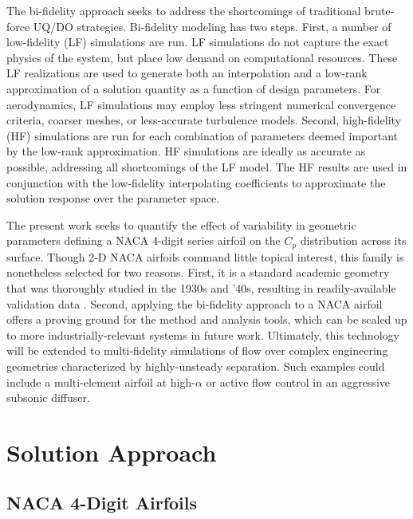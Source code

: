 \documentclass[11pt]{article}
\begin{document}
The bi-fidelity approach seeks to address the shortcomings of traditional brute-force UQ/DO strategies. Bi-fidelity modeling has two steps. First, a number of low-fidelity (LF) simulations are run. LF simulations do not capture the exact physics of the system, but place low demand on computational resources. These LF realizations are used to generate both an interpolation and a low-rank approximation of a solution quantity as a function of design parameters. For aerodynamics, LF simulations may employ less stringent numerical convergence criteria, coarser meshes, or less-accurate turbulence models. Second, high-fidelity (HF) simulations are run for each combination of parameters deemed important by the low-rank approximation. HF simulations are ideally as accurate as possible, addressing all shortcomings of the LF model. The HF results are used in conjunction with the low-fidelity interpolating coefficients to approximate the solution response over the parameter space.

The present work seeks to quantify the effect of variability in geometric parameters defining a NACA 4-digit series airfoil on the $C_p$ distribution across its surface. Though 2-D NACA airfoils command little topical interest, this family is nonetheless selected for two reasons. First, it is a standard academic geometry that was thoroughly studied in the 1930s and '40s, resulting in readily-available validation data \citeme. Second, applying the bi-fidelity approach to a NACA airfoil offers a proving ground for the method and analysis tools, which can be scaled up to more industrially-relevant systems in future work. Ultimately, this technology will be extended to multi-fidelity simulations of flow over complex engineering geometries characterized by highly-unsteady separation. Such examples could include a multi-element airfoil at high-$\alpha$ or active flow control in an aggressive subsonic diffuser.

\section{Solution Approach}

\subsection{NACA 4-Digit Airfoils}
\end{document}
